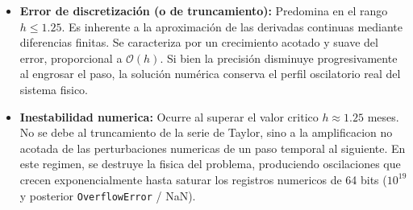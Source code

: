 \begin{itemize}
    \item \textbf{Error de discretización (o de truncamiento):} Predomina en el rango $h \le 1.25$. Es inherente a la aproximación de las derivadas continuas mediante diferencias finitas. Se caracteriza por un crecimiento acotado y suave del error, proporcional a $\mathcal{O}(h)$. Si bien la precisión disminuye progresivamente al engrosar el paso, la solución numérica conserva el perfil oscilatorio real del sistema fisico.
    
    \item \textbf{Inestabilidad numerica:} Ocurre al superar el valor critico $h \approx 1.25$ meses. No se debe al truncamiento de la serie de Taylor, sino a la amplificacion no acotada de las perturbaciones numericas de un paso temporal al siguiente. En este regimen, se destruye la fisica del problema, produciendo oscilaciones que crecen exponencialmente hasta saturar los registros numericos de 64 bits ($10^{19}$ y posterior \texttt{OverflowError} / \textsf{NaN}).
\end{itemize}
